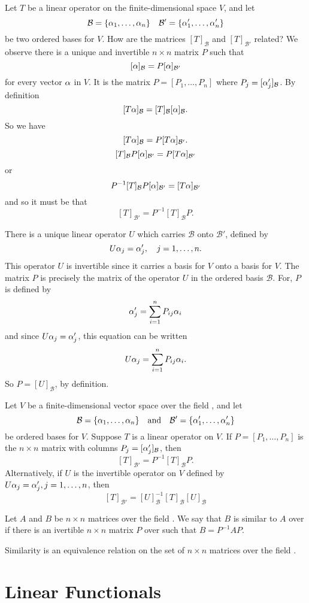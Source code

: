 \documentclass{mynotes}
\begin{document}
Let $T$ be a linear operator on the finite-dimensional space $V$, and let $$\mathcal{B}=\{\alpha_1,\ldots,\alpha_n\}\quad \mathcal{B'}=\{\alpha_1',\ldots,\alpha_n'\}$$be two ordered bases for $V$. How are the matrices $[T]_{\mathcal{B}}$ and $[T]_{\mathcal{B'}}$ related?
We observe there is a unique and invertible $n\times n$ matrix $P$ such that $$[\alpha]_{\mathcal{B}}=P[\alpha]_{\mathcal{B'}}$$for every vector $\alpha$ in $V$. It is the matrix $P=[P_1,\ldots,P_n]$ where $P_j = [\alpha_j']_{\mathcal{B}}$. By definition$$[T\alpha]_{\mathcal{B}}=[T]_{\mathcal{B}}[\alpha]_{\mathcal{B}}.$$So we have $$[T\alpha]_{\mathcal{B}} = P[T\alpha]_{\mathcal{B'}}.$$ $$[T]_{\mathcal{B}}P[\alpha]_{\mathcal{B'}}=P[T\alpha]_{\mathcal{B'}}$$or$$P^{-1}[T]_{\mathcal{B}}P[\alpha]_{\mathcal{B'}}=[T\alpha]_{\mathcal{B'}}$$ and so it must be that $$[T]_{\mathcal{B'}}=P^{-1}[T]_{\mathcal{B}}P.$$
\begin{remark}
There is a unique linear operator $U$ which carries $\mathcal{B}$ onto $\mathcal{B'}$, defined by $$U\alpha_j=\alpha_j',\quad j=1,\ldots,n.$$This operator $U$ is invertible since it carries a basis for $V$ onto a basis for $V$. The matrix $P$ is precisely the matrix of the operator $U$ in the ordered basis $\mathcal{B}$. For, $P$ is defined by $$\alpha_j'=\sum_{i=1}^nP_{ij}\alpha_i$$and since $U\alpha_j=\alpha_j'$, this equation can be written $$U\alpha_j=\sum_{i=1}^nP_{ij}\alpha_i.$$So $P=[U]_{\mathcal{B}}$, by definition.
\end{remark}
\begin{theorem}
Let $V$ be a finite-dimensional vector space over the field \F, and let $$\mathcal{B} =\{\alpha_1,\ldots,\alpha_n\}\quad\mbox{and}\quad\mathcal{B'}=\{\alpha_1',\ldots,\alpha_n'\}$$be ordered bases for $V$. Suppose $T$ is a linear operator on $V$. If $P=[P_1,\ldots,P_n]$ is the $n\times n$ matrix with columns $P_j = [\alpha_j']_{\mathcal{B}}$, then $$[T]_{\mathcal{B'}} = P^{-1}[T]_{\mathcal{B}}P.$$Alternatively, if $U$ is the invertible operator on $V$ defined by $U\alpha_j=\alpha_j',j=1,\ldots,n$, then $$[T]_{\mathcal{B'}} = [U]_{\mathcal{B}}^{-1}[T]_{\mathcal{B}}[U]_{\mathcal{B}}$$
\end{theorem}
\begin{definition}[similar]
Let $A$ and $B$ be $n\times n$ matrices over the field \F. We say that $B$ is similar to $A$ over \F if there is an ivertible $n\times n$ matrix $P$ over \F such that $B=P^{-1}AP.$
\end{definition}
\begin{remark}
Similarity is an equivalence relation on the set of $n\times n$ matrices over the field \F.
\end{remark}
\section{Linear Functionals}
\end{document}
